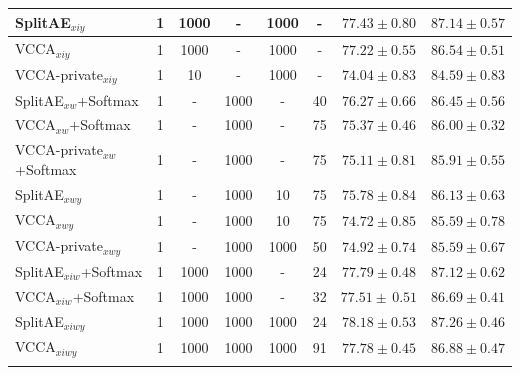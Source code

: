 \begin{table}[h]
{\begin{tabular}{l | c c c c | c | c c}
    {\small SplitAE$_{x i y}$} & 1 & 1000 & - & 1000 &  - & $77.43 \pm 0.80$ & $87.14 \pm 0.57$ \\ \hline    
    {\small VCCA$_{x i y}$} & 1 & 1000 & - & 1000 &  - & $77.22 \pm 0.55$ & $86.54 \pm 0.51$ \\ \hline
    {\small VCCA-private$_{x i y}$} & 1 & 10 & - & 1000 &  - & $74.04 \pm 0.83$ & $84.59 \pm 0.83$ \\      
    \Xhline{2\arrayrulewidth}
    
    {\small SplitAE$_{x w}$+Softmax} & 1 & - & 1000 & - &  40 & $76.27 \pm 0.66$ & $86.45 \pm 0.56$ \\ \hline 
    {\small VCCA$_{x w}$+Softmax} & 1 & - & 1000 & - &  75 & $75.37 \pm 0.46$ & $86.00 \pm 0.32$ \\ \hline 
    {\small VCCA-private$_{x w}$+Softmax} & 1 & - & 1000 & - &  75 & $75.11 \pm 0.81$ & $85.91 \pm 0.55$ \\
    \Xhline{2\arrayrulewidth} 
    
    {\small SplitAE$_{x w y}$} & 1 & - & 1000 & 10 &  75 & $75.78 \pm 0.84$ & $86.13 \pm 0.63$ \\ \hline
    {\small VCCA$_{x w y}$} & 1 & - & 1000 & 10 &  75 & $74.72 \pm 0.85$ & $85.59 \pm 0.78$ \\ \hline
    {\small VCCA-private$_{x w y}$} & 1 & - & 1000 & 1000 & 50 & $74.92 \pm 0.74$ & $85.59 \pm 0.67$ \\       
    \Xhline{2\arrayrulewidth} 
    
    {\small SplitAE$_{x i w}$+Softmax} & 1 & 1000 & 1000 & - &  24 & $77.79 \pm 0.48$ & $87.12 \pm 0.62$ \\
    {\small VCCA$_{x i w}$+Softmax} & 1 & 1000 & 1000 & - &  32 & $77.51 \pm \, 0.51$ & $86.69 \pm 0.41$ \\ \Xhline{2\arrayrulewidth}   
    
    {\small SplitAE$_{x i w y}$} & 1 & 1000 & 1000 & 1000 & 24 & $78.18 \pm 0.53$ & $87.26 \pm 0.46$ \\ 
    {\small VCCA$_{x i w y}$} & 1 & 1000 & 1000 & 1000 &  91 & $77.78 \pm 0.45$ & $86.88 \pm 0.47$ \\ 
    \Xhline{3\arrayrulewidth}
\end{tabular}
}
\vspace{-2mm}
\label{tab:classification_results_on_test_set_with_hyperparameters}
\end{table}


